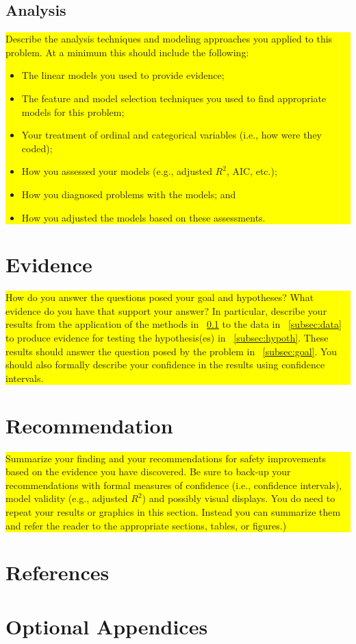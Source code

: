 \documentclass{article}
\begin{document}
\subsection{Analysis} \label{subsec:analysis}


\colorbox{yellow}{\parbox{5 in}{
Describe the analysis techniques and modeling approaches you applied to this problem. At a minimum this should include the following:

\begin{itemize}
\item The linear models you used to provide evidence;
\item The feature and model selection techniques you used to find appropriate models for this problem;
\item Your treatment of ordinal and categorical variables (i.e., how were they coded);
\item How you assessed your models (e.g., adjusted $R^{2}$, AIC, etc.);
\item How you diagnosed problems with the models; and
\item How you adjusted the models based on these assessments.
\end{itemize}
}}


\section{Evidence}\label{sec:evid}

\colorbox{yellow}{\parbox{5 in}{How do you answer the questions posed your goal and hypotheses? What evidence do you have that support your answer? In particular, describe your results from the application of the methods in ~\ref{subsec:analysis} to the data in ~\ref{subsec:data} to produce evidence for testing the hypothesis(es) in ~\ref{subsec:hypoth}. These results should answer the question posed by the problem in ~\ref{subsec:goal}. You should also formally describe your confidence in the results using confidence intervals.}}


\section{Recommendation}
\colorbox{yellow}{\parbox{5 in}{Summarize your finding and your recommendations for safety improvements based on the evidence you have discovered. Be sure to back-up your recommendations with formal measures of confidence (i.e., confidence intervals), model validity (e.g.,
adjusted $R^{2}$) and possibly visual displays. You do need to repeat your results or graphics in this section. Instead you can summarize them and refer the reader to the appropriate sections, tables, or figures.)
}}

\section{References}
\renewcommand\refname{} 



\appendix
\section{Optional Appendices}
\end{document}

